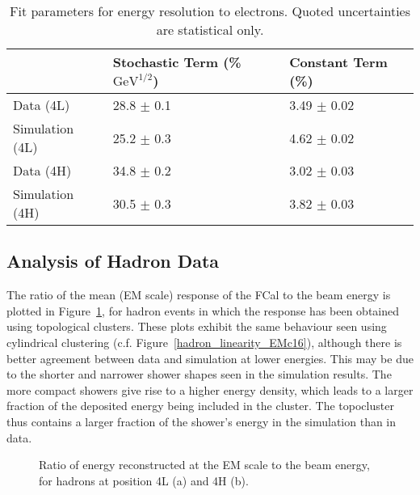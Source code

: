 \begin{table}[tb]
\begin{center}
\begin{tabular}{|l|l|l|}
\hline
& Stochastic Term (\% $\mathrm{GeV}^{1/2}$) & Constant Term (\%) \\
\hline
Data (4L) & 28.8 $\pm$ 0.1 & 3.49 $\pm$ 0.02\\
Simulation (4L) & 25.2 $\pm$ 0.3 & 4.62 $\pm$ 0.02\\
Data (4H) & 34.8 $\pm$ 0.2 & 3.02 $\pm$ 0.03\\
Simulation (4H) & 30.5 $\pm$ 0.3 & 3.82 $\pm$ 0.03\\
\hline
\end{tabular}
\end{center}
\caption[Electron resolution results, topoclusters]{Fit parameters for energy resolution to electrons. Quoted uncertainties are statistical only.}
\label{table_resolution_electrons_420}
\end{table}

%

%
%
%
\subsection{Analysis of Hadron Data}

The ratio of the mean (EM scale) response of the FCal to the beam energy is plotted in Figure~\ref{hadron_linearity_EMt420}, for hadron events in which the response has been obtained using topological clusters. These plots exhibit the same behaviour seen using cylindrical clustering (c.f. Figure~\ref{hadron_linearity_EMc16}), although there is better agreement between data and simulation at lower energies. This may be due to the shorter and narrower shower shapes seen in the simulation results. The more compact showers give rise to a higher energy density, which leads to a larger fraction of the deposited energy being included in the cluster. The topocluster thus contains a larger fraction of the shower's energy in the simulation than in data. 

\begin{figure}[tb]
\begin{centering}
\caption[Reconstructed energy (EM scale) vs beam energy, topoclusters (hadrons)]{Ratio of energy reconstructed at the EM scale to the beam energy, for hadrons at position 4L (a) and 4H (b).} 
\label{hadron_linearity_EMt420}
\end{centering}
\end{figure}

